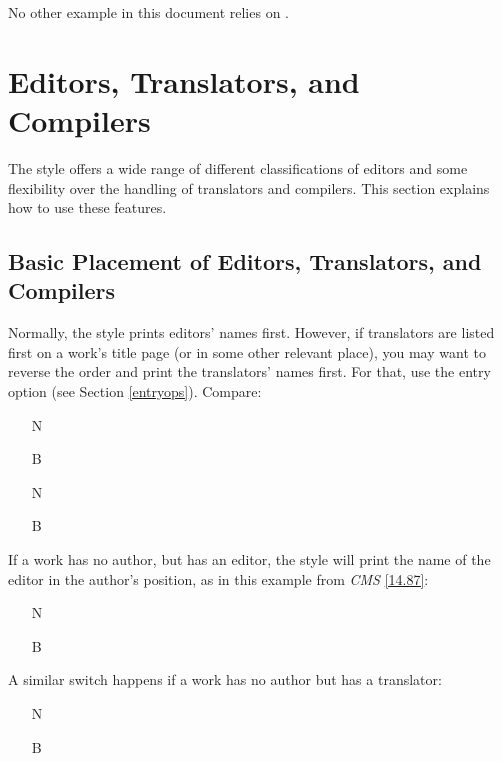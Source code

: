 \documentclass[11pt,letterpaper,oneside]{article}
\begin{document}
\noindent No other example in this document relies on .

\section{Editors, Translators, and Compilers}
\label{edtrans}

The style offers a wide range of different classifications of editors
and some flexibility over the handling of translators and compilers.
This section explains how to use these features.

\subsection{Basic Placement of Editors, Translators, and Compilers}
\label{edtranspos}

Normally, the style prints editors' names first. However, if
translators are listed first on a work's title page (or in some other
relevant place), you may want to reverse the order and print the
translators' names first. For that, use the entry option
 (see Section \ref{entryops}). Compare:

\begin{itemize}
\item[N] 

\item[B] 

\item[N] 

\item[B] 
\end{itemize}

If a work has no author, but has an editor, the style will print the
name of the editor in the author's position, as in this example from
\textit{CMS} \ref{14.87}:

\begin{itemize}
\item[N] 

\item[B] 
\end{itemize}

\noindent A similar switch happens if a work has no author but has a
translator:

\begin{itemize}
\item[N] 

\item[B] 
\end{itemize}
\end{document}
